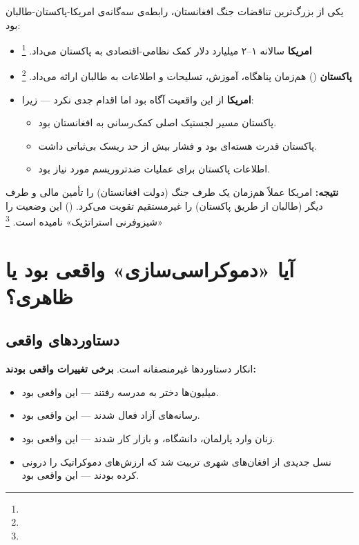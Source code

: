 \begin{tcolorbox}[enemybox, title={پارادوکس پاکستان}]
یکی از بزرگ‌ترین تناقضات جنگ افغانستان، رابطه‌ی سه‌گانه‌ی امریکا-پاکستان-طالبان بود:

\begin{itemize}[nosep, rightmargin=1em]
  \item \textbf{امریکا} سالانه ۱–۲ میلیارد دلار کمک نظامی-اقتصادی به پاکستان می‌داد.%
  \footnote{}
  \item \textbf{پاکستان} () هم‌زمان پناهگاه، آموزش، تسلیحات و اطلاعات به طالبان ارائه می‌داد.%
  \footnote{}
  \item \textbf{امریکا} از این واقعیت آگاه بود اما اقدام جدی نکرد — زیرا:
  \begin{itemize}[nosep]
    \item پاکستان مسیر لجستیک اصلی کمک‌رسانی به افغانستان بود.
    \item پاکستان قدرت هسته‌ای بود و فشار بیش از حد ریسک بی‌ثباتی داشت.
    \item اطلاعات پاکستان برای عملیات ضدتروریسم مورد نیاز بود.
  \end{itemize}
\end{itemize}

\textbf{نتیجه:} امریکا عملاً هم‌زمان یک طرف جنگ (دولت افغانستان) را تأمین مالی و طرف دیگر (طالبان از طریق پاکستان) را غیرمستقیم تقویت می‌کرد.  () این وضعیت را «شیزوفرنی استراتژیک» نامیده است.%
\footnote{}
\end{tcolorbox}

\section{آیا «دموکراسی‌سازی» واقعی بود یا ظاهری؟}
\label{sec:app-afg-democracy}

\subsection{دستاوردهای واقعی}

انکار دستاوردها غیرمنصفانه است. \textbf{برخی تغییرات واقعی بودند:}

\begin{itemize}[nosep, rightmargin=1em]
  \item میلیون‌ها دختر به مدرسه رفتند — این واقعی بود.
  \item رسانه‌های آزاد فعال شدند — این واقعی بود.
  \item زنان وارد پارلمان، دانشگاه، و بازار کار شدند — این واقعی بود.
  \item نسل جدیدی از افغان‌های شهری تربیت شد که ارزش‌های دموکراتیک را درونی کرده بودند — این واقعی بود.
\end{itemize}

